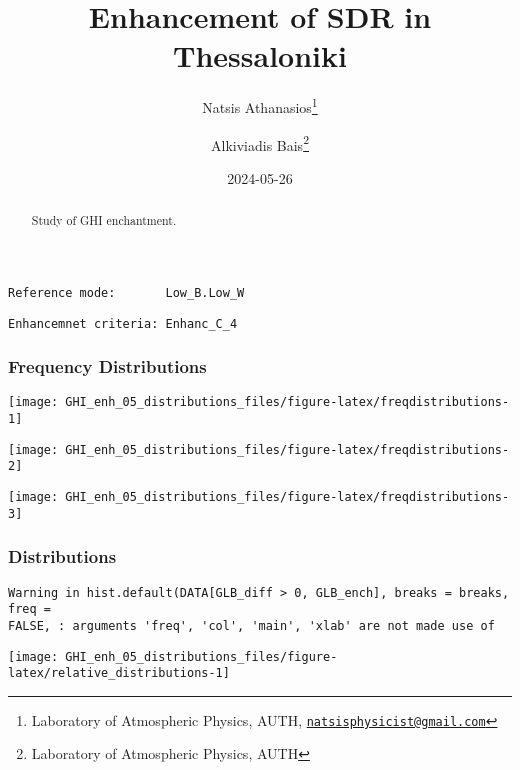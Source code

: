 \documentclass[
  10pt,
  a4paper,oneside]{article}
\title{Enhancement of SDR in Thessaloniki}
\author{Natsis Athanasios\footnote{Laboratory of Atmospheric Physics, AUTH, \href{mailto:natsisphysicist@gmail.com}{\nolinkurl{natsisphysicist@gmail.com}}} \and Alkiviadis Bais\footnote{Laboratory of Atmospheric Physics, AUTH}}
\date{2024-05-26}
\begin{document}
\maketitle
\begin{abstract}
Study of GHI enchantment.
\end{abstract}

{
\hypersetup{linkcolor=}
\setcounter{tocdepth}{4}
\tableofcontents
}
\begin{verbatim}
Reference mode:       Low_B.Low_W 
\end{verbatim}

\begin{verbatim}
Enhancemnet criteria: Enhanc_C_4 
\end{verbatim}

\FloatBarrier

\hypertarget{frequency-distributions}{%
\subsubsection{Frequency Distributions}\label{frequency-distributions}}

\begin{center}\texttt{[image: GHI\_enh\_05\_distributions\_files/figure-latex/freqdistributions-1]} \end{center}

\begin{center}\texttt{[image: GHI\_enh\_05\_distributions\_files/figure-latex/freqdistributions-2]} \end{center}

\begin{center}\texttt{[image: GHI\_enh\_05\_distributions\_files/figure-latex/freqdistributions-3]} \end{center}

\FloatBarrier

\hypertarget{distributions}{%
\subsubsection{Distributions}\label{distributions}}

\begin{verbatim}
Warning in hist.default(DATA[GLB_diff > 0, GLB_ench], breaks = breaks, freq =
FALSE, : arguments 'freq', 'col', 'main', 'xlab' are not made use of
\end{verbatim}

\begin{center}\texttt{[image: GHI\_enh\_05\_distributions\_files/figure-latex/relative\_distributions-1]} \end{center}
\end{document}
